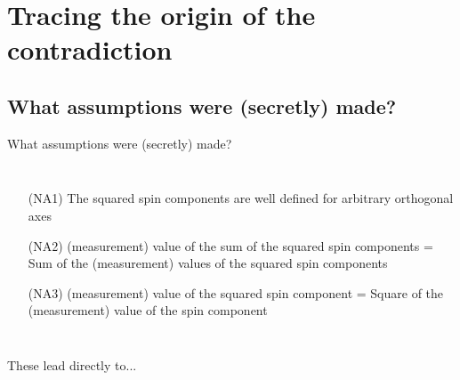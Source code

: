 \documentclass{beamer}
\begin{document}
\section{Tracing the origin of the contradiction}
\subsection{What assumptions were (secretly) made?}
\begin{frame}{What assumptions were (secretly) made?}
\begin{columns}
\begin{enumerate}
\item [(NA1)] The squared spin components are well defined for arbitrary orthogonal axes
\item [(NA2)] (measurement) value of the sum of the squared spin components = Sum of the (measurement) values of the squared spin components
\item [(NA3)] (measurement) value of the squared spin component = Square of the (measurement) value of the spin component
\end{enumerate}
\end{columns}
\vfill
These lead directly to...
\end{frame}
\end{document}
